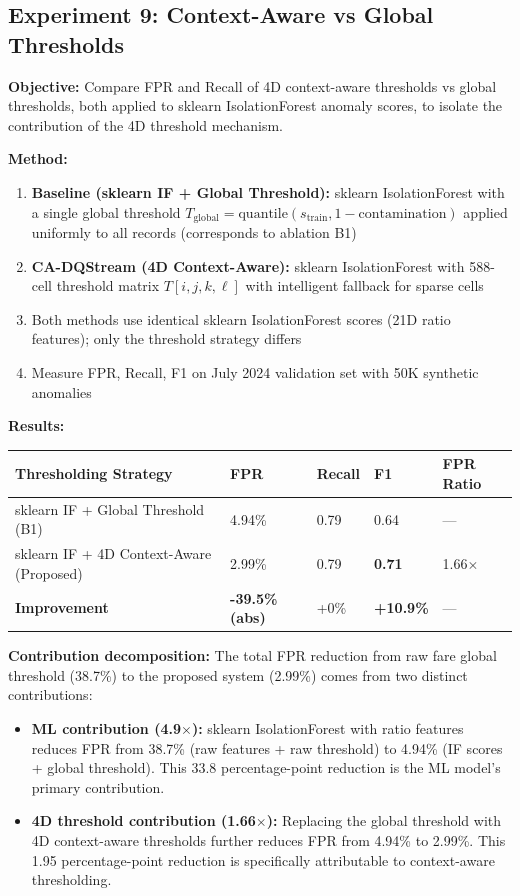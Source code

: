 \subsection{Experiment 9: Context-Aware vs Global Thresholds}

\textbf{Objective:} Compare FPR and Recall of 4D context-aware thresholds vs global thresholds, both applied to sklearn IsolationForest anomaly scores, to isolate the contribution of the 4D threshold mechanism.

\textbf{Method:}
\begin{enumerate}
    \item \textbf{Baseline (sklearn IF + Global Threshold):} sklearn IsolationForest with a single global threshold $T_{\text{global}} = \text{quantile}(s_{\text{train}}, 1 - \text{contamination})$ applied uniformly to all records (corresponds to ablation B1)
    \item \textbf{CA-DQStream (4D Context-Aware):} sklearn IsolationForest with 588-cell threshold matrix $T[i,j,k,\ell]$ with intelligent fallback for sparse cells
    \item Both methods use identical sklearn IsolationForest scores (21D ratio features); only the threshold strategy differs
    \item Measure FPR, Recall, F1 on July 2024 validation set with 50K synthetic anomalies
\end{enumerate}

\textbf{Results:}

\begin{longtable}{|m{5cm}|m{2.5cm}|m{2.5cm}|m{2.5cm}|m{2.5cm}|}
\hline
\textbf{Thresholding Strategy} & \textbf{FPR} & \textbf{Recall} & \textbf{F1} & \textbf{FPR Ratio} \\ \hline
sklearn IF + Global Threshold (B1) & 4.94\% & 0.79 & 0.64 & --- \\ \hline
sklearn IF + 4D Context-Aware (Proposed) & 2.99\% & 0.79 & \textbf{0.71} & 1.66$\times$ \\ \hline
\textbf{Improvement} & \textbf{-39.5\% (abs)} & +0\% & \textbf{+10.9\%} & --- \\ \hline
\end{longtable}

\textbf{Contribution decomposition:} The total FPR reduction from raw fare global threshold (38.7\%) to the proposed system (2.99\%) comes from two distinct contributions:
\begin{itemize}
    \item \textbf{ML contribution (4.9$\times$):} sklearn IsolationForest with ratio features reduces FPR from 38.7\% (raw features + raw threshold) to 4.94\% (IF scores + global threshold). This 33.8 percentage-point reduction is the ML model's primary contribution.
    \item \textbf{4D threshold contribution (1.66$\times$):} Replacing the global threshold with 4D context-aware thresholds further reduces FPR from 4.94\% to 2.99\%. This 1.95 percentage-point reduction is specifically attributable to context-aware thresholding.
\end{itemize}

